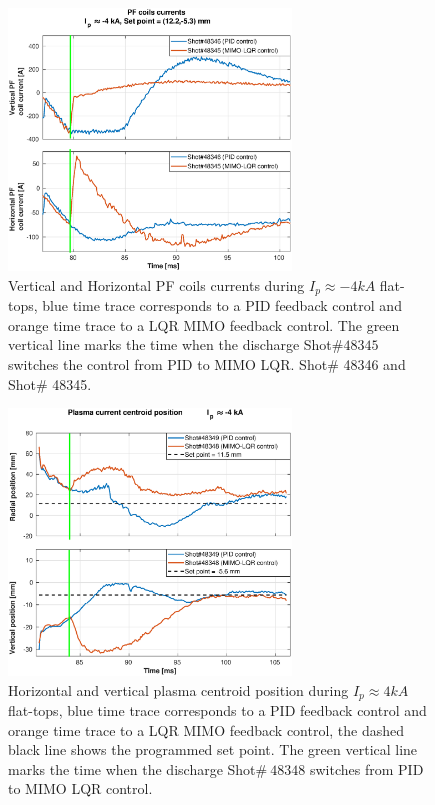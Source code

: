 \begin{figure}
	\centering
	\includegraphics[width=0.67\textwidth]{Chp5/PIDvsMIMO_346_345_curr_2.eps}
	\caption{Vertical and Horizontal PF coils currents during  $I_p\approx -4kA$  flat-tops, blue time trace corresponds to a PID feedback control and orange time trace to a LQR MIMO feedback control. The green vertical line marks the time  when the  discharge Shot$\# 48345$ switches the control from PID to MIMO LQR.  Shot$\#$  48346 and  Shot$\#$ 48345.}
\end{figure}

\begin{figure}
	\centering
	\includegraphics[width=0.67\textwidth]{Chp5/PIDvsMIMO_349_348_2.eps}
	\caption{Horizontal and vertical plasma centroid position during  $I_p\approx 4kA$  flat-tops, blue time trace corresponds to a PID feedback control and orange time trace to a LQR MIMO feedback control, the dashed black line shows the programmed set point. The green vertical line marks the time  when the  discharge Shot$\# ~48348$ switches  from PID to MIMO LQR control.}
\end{figure}

